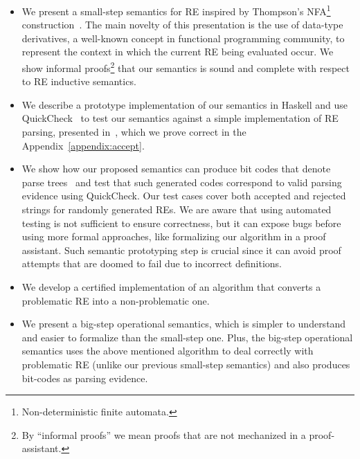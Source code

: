 \documentclass[oneside,12pt]{scrbook}
\theoremstyle{definition}
\theoremstyle{plain}
\theoremstyle{definition}
\begin{document}
\begin{itemize}
	\item We present a small-step semantics for RE inspired by  Thompson's NFA\footnote{Non-deterministic finite automata.}
	construction~\cite{Thompson1968}. The main novelty of this presentation is
	the use of data-type derivatives, a well-known concept in functional programming community, to represent
	the context in which the current RE being evaluated occur. We show informal proofs\footnote{By ``informal proofs'' we
		mean proofs that are not mechanized in a proof-assistant.} that our semantics is sound and complete with respect to RE inductive semantics.
	 \item We describe a prototype implementation of our semantics in Haskell and use QuickCheck~\cite{Claessen2000} to test our semantics
	 against a simple implementation of RE parsing, presented in~\cite{Fischer2010}, which we prove correct in the Appendix~\ref{appendix:accept}. 
	 \item We show how our proposed semantics can produce bit codes that denote parse trees~\cite{Lasse2011} and test that
	 such generated codes correspond to valid parsing evidence using QuickCheck.
	 Our test cases cover both accepted and rejected strings for randomly generated REs. We are aware that using automated testing is not sufficient to ensure correctness, but it can expose bugs before using more formal approaches,
	 like formalizing our algorithm in a proof assistant. Such semantic prototyping step is crucial since it can avoid proof attempts that are
	 doomed to fail due to incorrect definitions.
	 	\item We develop a certified implementation of an algorithm that converts a problematic RE into a non-problematic one.
	 \item We present a big-step operational semantics, which is simpler to understand and easier to formalize than the small-step one. Plus, the big-step operational semantics uses the above mentioned algorithm to deal correctly with problematic RE (unlike our previous small-step semantics) and also produces bit-codes as parsing evidence.


\end{itemize}
\end{document}
